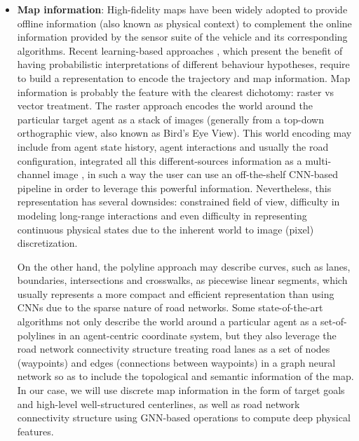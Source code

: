 \begin{itemize}
	\item \textbf{Map information}: High-fidelity maps \cite{can2022maps} have been widely adopted to provide offline information (also known as physical context) to complement the online information provided by the sensor suite of the vehicle and its corresponding algorithms. Recent learning-based approaches \cite{mahjourian2022occupancy, casas2018intentnet, ivanovic2021heterogeneous}, which present the benefit of having probabilistic interpretations of different behaviour hypotheses, require to build a representation to encode the trajectory and map information. Map information is probably the feature with the clearest dichotomy: raster vs vector treatment. The raster approach encodes the world around the particular target agent as a stack of images (generally from a top-down orthographic view, also known as Bird's Eye View). This world encoding may include from agent state history, agent interactions and usually the road configuration, integrated all this different-sources information as a multi-channel image \cite{gilles2021home}, in such a way the user can use an off-the-shelf \ac{CNN}-based pipeline in order to leverage this powerful information. Nevertheless, this representation has several downsides: constrained field of view, difficulty in modeling long-range interactions and even difficulty in representing continuous physical states due to the inherent world to image (pixel) discretization. 
	
	On the other hand, the polyline approach may describe curves, such as lanes, boundaries, intersections and crosswalks, as piecewise linear segments, which usually represents a more compact and efficient representation than using CNNs due to the sparse nature of road networks. Some state-of-the-art algorithms not only describe the world around a particular agent as a set-of-polylines \cite{khandelwal2020if} \cite{zhao2021tnt} in an agent-centric coordinate system, but they also leverage the road network connectivity structure \cite{liang2020learning} \cite{zeng2021lanercnn} treating road lanes as a set of nodes (waypoints) and edges (connections between waypoints) in a graph neural network so as to include the topological and semantic information of the map. In our case, we will use discrete map information in the form of target goals and high-level well-structured centerlines, as well as road network connectivity structure using \ac{GNN}-based operations to compute deep physical features.
	

\end{itemize}
